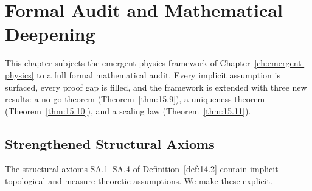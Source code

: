
\chapter{Formal Audit and Mathematical Deepening}
\label{ch:formal-audit}

\vspace{0.5em}
\noindent
This chapter subjects the emergent physics framework of
Chapter~\ref{ch:emergent-physics} to a full formal mathematical audit.
Every implicit assumption is surfaced, every proof gap is filled, and the
framework is extended with three new results: a no-go theorem
(Theorem~\ref{thm:15.9}), a uniqueness theorem (Theorem~\ref{thm:15.10}),
and a scaling law (Theorem~\ref{thm:15.11}).

\section{Strengthened Structural Axioms}
\label{sec:ch15:axioms}

The structural axioms SA.1--SA.4 of Definition~\ref{def:14.2} contain
implicit topological and measure-theoretic assumptions.  We make these
explicit.

